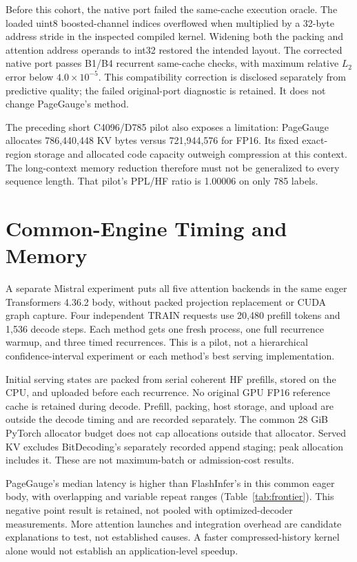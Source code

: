 \documentclass{article}
\begin{document}
Before this cohort, the native port failed the same-cache execution oracle.
The loaded uint8 boosted-channel indices overflowed when multiplied by a
32-byte address stride in the inspected compiled kernel. Widening both the
packing and attention address operands to int32 restored the intended layout.
The corrected native port passes B1/B4 recurrent same-cache checks, with maximum
relative $L_2$ error below $4.0\times10^{-5}$. This compatibility correction is
disclosed separately from predictive quality; the failed original-port
diagnostic is retained. It does not change PageGauge's method.

The preceding short C4096/D785 pilot also exposes a limitation: PageGauge
allocates 786,440,448 KV bytes versus 721,944,576 for FP16. Its fixed exact-region
storage and allocated code capacity outweigh compression at this context.
The long-context memory reduction therefore must not be generalized to every
sequence length. That pilot's PPL/HF ratio is 1.00006 on only 785 labels.

\section{Common-Engine Timing and Memory}
A separate Mistral experiment puts all five attention backends in the same
eager Transformers 4.36.2 body, without packed projection replacement or CUDA
graph capture. Four independent TRAIN requests use 20,480 prefill tokens and
1,536 decode steps. Each method gets one fresh process, one full recurrence
warmup, and three timed recurrences. This is a pilot, not a hierarchical
confidence-interval experiment or each method's best serving implementation.

Initial serving states are packed from serial coherent HF prefills, stored on
the CPU, and uploaded before each recurrence. No original GPU FP16 reference
cache is retained during decode. Prefill, packing, host storage, and upload are
outside the decode timing and are recorded separately. The common 28 GiB
PyTorch allocator budget does not cap allocations outside that allocator.
Served KV excludes BitDecoding's separately recorded append staging; peak
allocation includes it. These are not maximum-batch or admission-cost results.

PageGauge's median latency is higher than FlashInfer's in this common eager
body, with overlapping and variable repeat ranges (Table~\ref{tab:frontier}).
This negative point result is retained, not pooled with optimized-decoder
measurements. More attention launches and integration overhead are candidate
explanations to test, not established causes. A faster compressed-history kernel
alone would not establish an application-level speedup.
\end{document}
